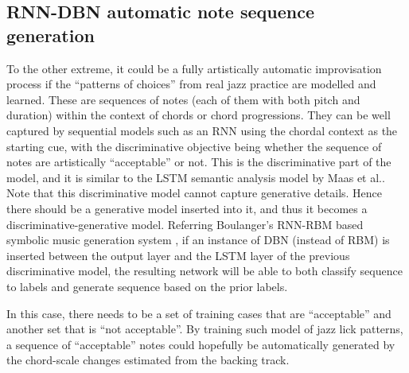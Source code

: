 
\subsection{RNN-DBN automatic note sequence generation}
To the other extreme, it could be a fully artistically automatic improvisation process if the ``patterns of choices'' from real jazz practice \cite{jazzguitarimpro,pracjazz} are modelled and learned. These are sequences of notes (each of them with both pitch and duration) within the context of chords or chord progressions. They can be well captured by sequential models such as an RNN using the chordal context as the starting cue, with the discriminative objective being whether the sequence of notes are artistically ``acceptable'' or not. This is the discriminative part of the model, and it is similar to the LSTM semantic analysis model by Maas et al.\cite{maas2011learning}. Note that this discriminative model cannot capture generative details. Hence there should be a generative model inserted into it, and thus it becomes a discriminative-generative model. Referring Boulanger's RNN-RBM based symbolic music generation system \cite{boulanger2012modeling}, if an instance of DBN (instead of RBM) is inserted between the output layer and the LSTM layer of the previous discriminative model, the resulting network will be able to both classify sequence to labels and generate sequence based on the prior labels.

In this case, there needs to be a set of training cases that are ``acceptable'' and another set that is ``not acceptable''. By training such model of jazz lick patterns, a sequence of ``acceptable'' notes could hopefully be automatically generated by the chord-scale changes estimated from the backing track.





 






